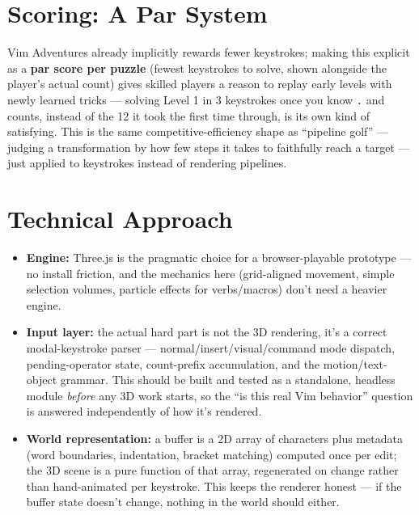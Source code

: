 \documentclass[11pt]{article}
\providecommand{\tightlist}{%
  \setlength{\itemsep}{0pt}\setlength{\parskip}{0pt}}
\begin{document}
\hypertarget{sec-scoring-a-par-system}{%
\section{Scoring: A Par System}\label{sec-scoring-a-par-system}}

Vim Adventures already implicitly rewards fewer keystrokes; making this
explicit as a \textbf{par score per puzzle} (fewest keystrokes to solve, shown
alongside the player's actual count) gives skilled players a reason to replay
early levels with newly learned tricks --- solving Level 1 in 3 keystrokes once
you know \texttt{.} and counts, instead of the 12 it took the first time through, is
its own kind of satisfying. This is the same competitive-efficiency shape as
``pipeline golf'' --- judging a transformation by how few steps it takes to
faithfully reach a target --- just applied to keystrokes instead of rendering
pipelines.

\hypertarget{sec-technical-approach}{%
\section{Technical Approach}\label{sec-technical-approach}}

\begin{itemize}
\tightlist
\item
  \textbf{Engine:} Three.js is the pragmatic choice for a browser-playable
  prototype --- no install friction, and the mechanics here (grid-aligned
  movement, simple selection volumes, particle effects for verbs/macros)
  don't need a heavier engine.
\item
  \textbf{Input layer:} the actual hard part is not the 3D rendering, it's a
  correct modal-keystroke parser --- normal/insert/visual/command mode
  dispatch, pending-operator state, count-prefix accumulation, and the
  motion/text-object grammar. This should be built and tested as a
  standalone, headless module \emph{before} any 3D work starts, so the ``is this
  real Vim behavior'' question is answered independently of how it's rendered.
\item
  \textbf{World representation:} a buffer is a 2D array of characters plus
  metadata (word boundaries, indentation, bracket matching) computed once per
  edit; the 3D scene is a pure function of that array, regenerated on change
  rather than hand-animated per keystroke. This keeps the renderer honest ---
  if the buffer state doesn't change, nothing in the world should either.
\end{itemize}
\end{document}
